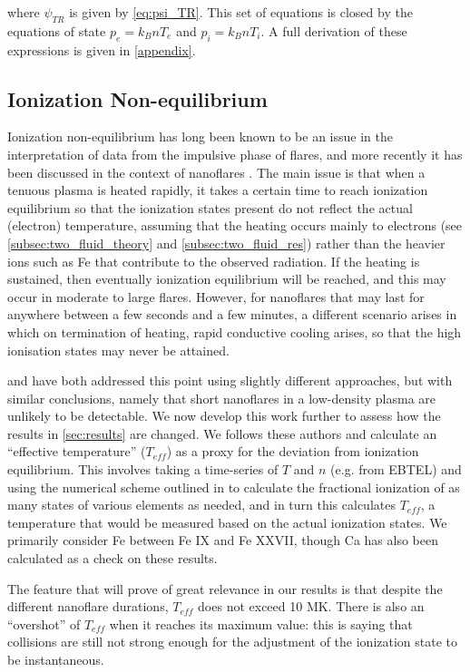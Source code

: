 \documentclass[apj]{emulateapj}
\begin{document}
	where $\psi_{TR}$ is given by \autoref{eq:psi_TR}. This set of equations is closed by the equations of state $p_e=k_BnT_e$ and $p_i=k_BnT_i$. A full derivation of these expressions is given in \autoref{appendix}.
	\subsection{Ionization Non-equilibrium}
	\label{subsec:nei_theory}
	\par Ionization non-equilibrium has long been known to be an issue in the interpretation of data from the impulsive phase of flares, and more recently it has been discussed in the context of nanoflares \citep{bradshaw_explosive_2006,reale_nonequilibrium_2008}. The main issue is that when a tenuous plasma is heated rapidly, it takes a certain time to reach ionization equilibrium so that the ionization states present do not reflect the actual (electron) temperature, assuming that the heating occurs mainly to electrons (see \autoref{subsec:two_fluid_theory} and \autoref{subsec:two_fluid_res}) rather than the heavier ions such as Fe that contribute to the observed radiation. If the heating is sustained, then eventually ionization equilibrium will be reached, and this may occur in moderate to large flares. However, for nanoflares that may last for anywhere between a few seconds and a few minutes, a different scenario arises in which on termination of heating, rapid conductive cooling arises, so that the high ionisation states may never be attained.
	\par \citet{reale_nonequilibrium_2008} and \citet{bradshaw_numerical_2009} have both addressed this point using slightly different approaches, but with similar conclusions, namely that short nanoflares in a low-density plasma are unlikely to be detectable. We now develop this work further to assess how the results in \autoref{sec:results} are changed. We follows these authors and calculate an ``effective temperature'' ($T_{eff}$) as a proxy for the deviation from ionization equilibrium. This involves taking a time-series of $T$ and $n$ (e.g. from EBTEL) and using the numerical scheme outlined in \citet{bradshaw_numerical_2009} to calculate the fractional ionization of as many states of various elements as needed, and in turn this calculates $T_{eff}$, a temperature that would be measured based on the actual ionization states. We primarily consider Fe between Fe IX and Fe XXVII, though Ca has also been calculated as a check on these results.
	\par The feature that will prove of great relevance in our results is that despite the different nanoflare durations, $T_{eff}$ does not exceed 10 MK. There is also an ``overshot'' of $T_{eff}$ when it reaches its maximum value: this is saying that collisions are still not strong enough for the adjustment of the ionization state to be instantaneous.
\end{document}
